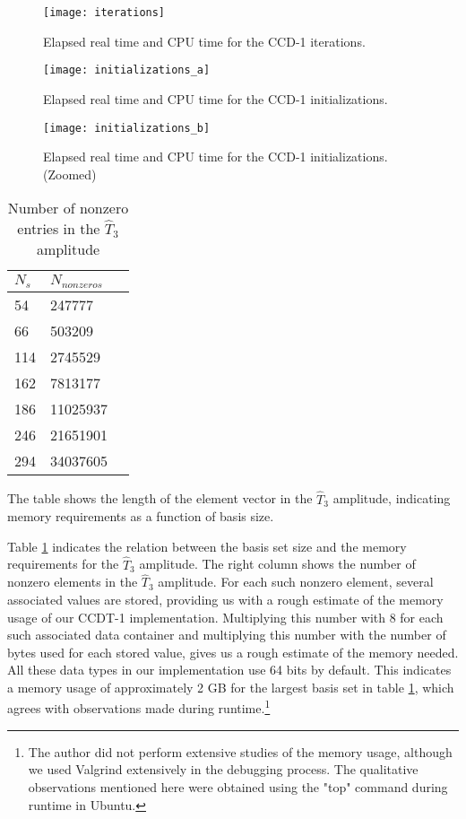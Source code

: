 \begin{figure}[!htb]
  \centering
  \texttt{[image: iterations]}
  \caption{Elapsed real time and CPU time for the CCD-1 iterations.}
\label{fig:it}
\end{figure}

\begin{figure}[!htb]
  \centering
  \texttt{[image: initializations\_a]}
  \caption{Elapsed real time and CPU time for the CCD-1 initializations.}
\label{fig:inia}
\end{figure}

\begin{figure}[!htb]
  \centering
  \texttt{[image: initializations\_b]}
  \caption{Elapsed real time and CPU time for the CCD-1 initializations. (Zoomed)}
\label{fig:inib}
\end{figure}


\begin{table}[hbtp]
\caption{Number of nonzero entries in the $\hat{T}_3$ amplitude}
\begin{center}
\begin{threeparttable}
\begin{tabular}{l l l}
    \toprule
$N_s$ & $N_{nonzeros}$ \\ \hline 
54 & 247777 \\
66 & 503209 \\ 
114 & 2745529 \\
162 & 7813177 \\
186 & 11025937 \\
246 & 21651901 \\
294 & 34037605 \\
\bottomrule
\end{tabular}
\begin{tablenotes}
The table shows the length of the element vector in the $\hat{T}_3$ amplitude, indicating memory requirements as a function of basis size.
\end{tablenotes}
\end{threeparttable}
\end{center}
\label{tab:memscale}
\end{table}

Table \ref{tab:memscale} indicates the relation between the basis set
size and the memory requirements for the $\hat{T}_3$ amplitude. The right
column shows the number of nonzero elements in the $\hat{T}_3$
amplitude. For each such nonzero element, several associated values
are stored, providing us with a rough estimate of the memory usage of our CCDT-1
implementation. Multiplying this number with 8 for each
such associated data container and multiplying this number with the number of
bytes used for each stored value, gives us a rough estimate of the memory needed. All these data types in our
implementation use 64 bits by default.
This indicates a memory usage of approximately 2 GB
for the largest basis set in table \ref{tab:memscale}, which agrees
with observations made during runtime.\footnote{The author did not
  perform extensive studies of the memory usage, although we used
  Valgrind extensively in the debugging process. The qualitative observations
  mentioned here were obtained using the "top" command during runtime in
  Ubuntu.}

